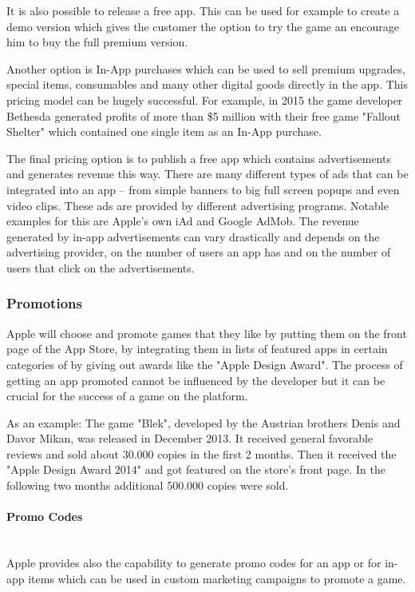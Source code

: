 It is also possible to release a free app. This can be used for example to create a demo version which gives the customer the option to try the game an encourage him to buy the full premium version.

Another option is In-App purchases which can be used to sell premium upgrades, special items, consumables and many other digital goods directly in the app. This pricing model can be hugely successful. For example, in 2015 the game developer Bethesda generated profits of more than \$5 million with their free game "Fallout Shelter" which contained one single item as an In-App purchase. \citep{tassi_fallout_2015}

The final pricing option is to publish a free app which contains advertisements and generates revenue this way. There are many different types of ads that can be integrated into an app – from simple banners to big full screen popups and even video clips. These ads are provided by different advertising programs. Notable examples for this are Apple's own iAd and Google AdMob. The revenue generated by in-app advertisements can vary drastically and depends on the advertising provider, on the number of users an app has and on the number of users that click on the advertisements.  

\subsubsection{Promotions}
\label{subsec:ios_promotions}
Apple will choose and promote games that they like by putting them on the front page of the App Store, by integrating them in lists of featured apps in certain categories of by giving out awards like the "Apple Design Award". The process of getting an app promoted cannot be influenced by the developer but it can be crucial for the success of a game on the platform.

As an example: The game "Blek", developed by the Austrian brothers Denis and Davor Mikan, was released in December 2013. It received general favorable reviews and sold about 30.000 copies in the first 2 months. Then it received the "Apple Design Award 2014" and got featured on the store's front page. In the following two months additional 500.000 copies were sold. \citep{borison_blek_2014}

\paragraph{Promo Codes}\mbox{}\\
Apple provides also the capability to generate promo codes for an app or for in-app items which can be used in custom marketing campaigns to promote a game.

